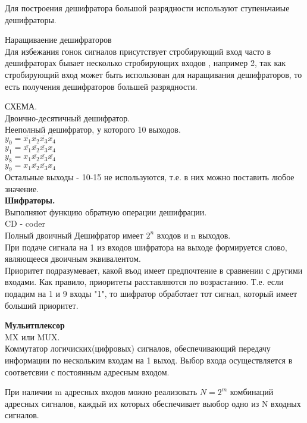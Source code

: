 Для построения дешифратора большой разрядности используют ступеньчаиые дешифраторы.

Наращиваение дешифраторов\\

Для избежания гонок сигналов присутствует стробирующий вход  часто в дешифраторах бывает несколько стробирующих входов , например 2,
так как стробирующий вход может быть использован для наращивания дешифраторов, то есть получения дешифраторов большей разрядности.

СХЕМА.\\


Двоично-десятичный дешифратор.\\
Нееполный дешифратор, у которого 10 выходов.\\
 $y_0 = \overline{x_1} \overline{x_2} \overline{x_3} \overline{x_4} $\\
 $y_1 = \overline{x_1} \overline{x_2} \overline{x_3} x_4 $\\
 $y_8 = x_1 \overline{x_2} \overline{x_3} \overline{x_4} $\\
 $y_9 = x_1 \overline{x_2} \overline{x_3} x_4 $\\
Остальные выходы - 10-15 не используются, т.е. в них можно поставить любое значение.\\

\Large{ \textbf {Шифраторы.}}\\
Выполняют функцию обратную операции дешифрации.\\
CD - coder\\
Полный  двоичный Дешифратор имеет $2^n$ входов и n выходов.\\
При подаче сигнала на 1 из входов шифратора на выходе формируется слово, являющееся двоичным эквивалентом.\\

Приоритет подразумевает, какой въод имеет предпочтение в сравнении с другими входами.
Как правило, приоритеты расставляются по возрастанию.
Т.е. если подадим на 1 и 9 входы "1", то шифратор обработает тот сигнал, который имеет больший приоритет.



\textbf {Мульитплексор}\\
MX или MUX.\\
Коммутатор логичиских(цифровых) сигналов, обеспечивающий передачу информации
по нескольким входам на 1 выход. Выбор входа осуществляется в соответсвии с постоянным адресным входом.

При наличии m адресных входов можно реализовать $ N = 2^m $ комбинаций адресных сигналов,
каждый их которых обеспечивает выобор одно из N входных сигналов.

